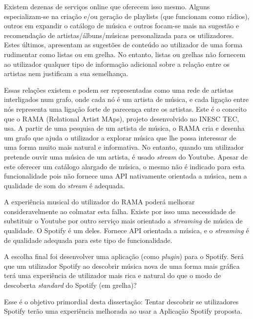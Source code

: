 Existem dezenas de serviços online que oferecem isso mesmo.
Alguns especializam-se na criação e/ou geração de playlists (que funcionam como rádios), outros em expandir o catálogo de música e outros focam-se mais na sugestão e recomendação de artistas/álbuns/músicas personalizada para os utilizadores.
Estes últimos, apresentam as sugestões de conteúdo ao utilizador de uma forma rudimentar como listas ou em grelha.
No entanto, listas ou grelhas não fornecem ao utilizador qualquer tipo de informação adicional sobre a relação entre os artistas nem justificam a sua semelhança.

Essas relações existem e podem ser representadas como uma rede de artistas interligados num grafo, onde cada nó é um artista de música, e cada ligação entre nós representa uma ligação forte de parecença entre os artistas.
Este é o conceito que o RAMA (Relational Artist MAps), projeto desenvolvido no INESC TEC, usa.
A partir de uma pesquisa de um artista de música, o RAMA cria e desenha um grafo que ajuda o utilizador a explorar música que lhe possa interessar de uma forma muito mais natural e informativa.
No entanto, quando um utilizador pretende ouvir uma música de um artista, é usado \emph{stream} do Youtube. 
Apesar de este oferecer um catálogo alargado de música, o mesmo não é indicado para esta funcionalidade pois não fornece uma API nativamente orientada a música, nem a qualidade de som do \emph{stream} é adequada.

A experiência musical do utilizador do RAMA poderá melhorar consideravelmente ao colmatar esta falha.
Existe por isso uma necessidade de substituir o Youtube por outro serviço mais orientado a \emph{streaming} de música de qualidade.
O Spotify é um deles. Fornece API orientada a música, e o \emph{streaming} é de qualidade adequada para este tipo de funcionalidade.

A escolha final foi desenvolver uma aplicação (como \emph{plugin}) para o Spotify.
Será que um utilizador Spotify ao descobrir música nova de uma forma mais gráfica terá uma experiência de utilizador mais rica e natural do que o modo de descoberta \emph{standard} do Spotify (em grelha)?

Esse é o objetivo primordial desta dissertação: Tentar descobrir se utilizadores Spotify terão uma experiência melhorada ao usar a Aplicação Spotify proposta.
